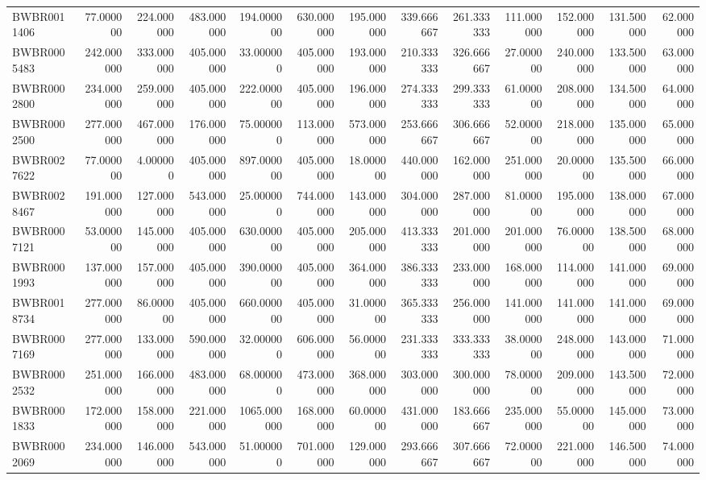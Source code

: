 \begin{longtable}{lrrrrrrrrrrrr}
BWBR0011406 & 77.000000 & 224.000000 & 483.000000 & 194.000000 & 630.000000 & 195.000000 & 339.666667 & 261.333333 & 111.000000 & 152.000000 & 131.500000 & 62.000000 \\
BWBR0005483 & 242.000000 & 333.000000 & 405.000000 & 33.000000 & 405.000000 & 193.000000 & 210.333333 & 326.666667 & 27.000000 & 240.000000 & 133.500000 & 63.000000 \\
BWBR0002800 & 234.000000 & 259.000000 & 405.000000 & 222.000000 & 405.000000 & 196.000000 & 274.333333 & 299.333333 & 61.000000 & 208.000000 & 134.500000 & 64.000000 \\
BWBR0002500 & 277.000000 & 467.000000 & 176.000000 & 75.000000 & 113.000000 & 573.000000 & 253.666667 & 306.666667 & 52.000000 & 218.000000 & 135.000000 & 65.000000 \\
BWBR0027622 & 77.000000 & 4.000000 & 405.000000 & 897.000000 & 405.000000 & 18.000000 & 440.000000 & 162.000000 & 251.000000 & 20.000000 & 135.500000 & 66.000000 \\
BWBR0028467 & 191.000000 & 127.000000 & 543.000000 & 25.000000 & 744.000000 & 143.000000 & 304.000000 & 287.000000 & 81.000000 & 195.000000 & 138.000000 & 67.000000 \\
BWBR0007121 & 53.000000 & 145.000000 & 405.000000 & 630.000000 & 405.000000 & 205.000000 & 413.333333 & 201.000000 & 201.000000 & 76.000000 & 138.500000 & 68.000000 \\
BWBR0001993 & 137.000000 & 157.000000 & 405.000000 & 390.000000 & 405.000000 & 364.000000 & 386.333333 & 233.000000 & 168.000000 & 114.000000 & 141.000000 & 69.000000 \\
BWBR0018734 & 277.000000 & 86.000000 & 405.000000 & 660.000000 & 405.000000 & 31.000000 & 365.333333 & 256.000000 & 141.000000 & 141.000000 & 141.000000 & 69.000000 \\
BWBR0007169 & 277.000000 & 133.000000 & 590.000000 & 32.000000 & 606.000000 & 56.000000 & 231.333333 & 333.333333 & 38.000000 & 248.000000 & 143.000000 & 71.000000 \\
BWBR0002532 & 251.000000 & 166.000000 & 483.000000 & 68.000000 & 473.000000 & 368.000000 & 303.000000 & 300.000000 & 78.000000 & 209.000000 & 143.500000 & 72.000000 \\
BWBR0001833 & 172.000000 & 158.000000 & 221.000000 & 1065.000000 & 168.000000 & 60.000000 & 431.000000 & 183.666667 & 235.000000 & 55.000000 & 145.000000 & 73.000000 \\
BWBR0002069 & 234.000000 & 146.000000 & 543.000000 & 51.000000 & 701.000000 & 129.000000 & 293.666667 & 307.666667 & 72.000000 & 221.000000 & 146.500000 & 74.000000 \\

\end{longtable}
